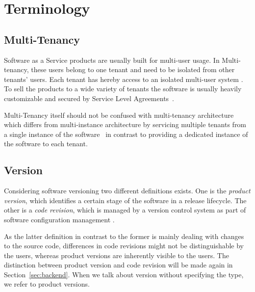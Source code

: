 \section{Terminology}
\label{sec:terminology}

\subsection{Multi-Tenancy}

Software as a Service products are usually built for multi-user usage. In Multi-tenancy, these users belong to one tenant and need to be isolated from other tenants' users. Each tenant has hereby access to an isolated multi-user system \cite{Chong2006a}. To sell the products to a wide variety of tenants the software is usually heavily customizable and secured by Service Level Agreements~\cite{Bezemer2010}.

Multi-Tenancy itself should not be confused with multi-tenancy architecture which differs from multi-instance architecture by servicing multiple tenants from a single instance of the software~\cite{Shao2011} in contrast to providing a dedicated instance of the software to each tenant.

\subsection{Version}

Considering software versioning two different definitions exists. One is the \emph{product version}, which identifies a certain stage of the software in a release lifecycle. The other is a \emph{code revision}, which is managed by a version control system as part of software configuration management \cite{swebook}.

As the latter definition in contrast to the former is mainly dealing with changes to the source code, differences in code revisions might not be distinguishable by the users, whereas product versions are inherently visible to the users. The distinction between product version and code revision will be made again in Section~\ref{sec:backend}. When we talk about version without specifying the type, we refer to product versions.

